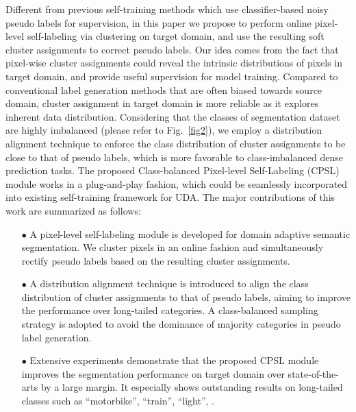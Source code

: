\documentclass[10pt,twocolumn,letterpaper]{article}
\begin{document}
	Different from previous self-training methods which use classifier-based noisy pseudo labels for supervision, in this paper we propose to perform online pixel-level self-labeling via clustering on target domain, and use the resulting soft cluster assignments to correct pseudo labels. Our idea comes from the fact that pixel-wise cluster assignments could reveal the intrinsic distributions of pixels in target domain, and provide useful supervision for model training. Compared to conventional label generation methods that are often biased towards source domain, cluster assignment in target domain is more reliable as it explores inherent data distribution. Considering that the classes of segmentation dataset are highly imbalanced (please refer to Fig.~\ref{fig2}), we employ a distribution alignment technique to enforce the class distribution of cluster assignments to be close to that of pseudo labels, which is more favorable to class-imbalanced dense prediction tasks. The proposed Class-balanced Pixel-level Self-Labeling (CPSL) module works in a plug-and-play fashion, which could be seamlessly incorporated into existing self-training framework for UDA. The major contributions of this work are summarized as follows:\\
\vspace{-0.5em}
	\vspace{-1.0em}\begin{itemize}[leftmargin=*]
		\item[$\bullet$] A pixel-level self-labeling module is developed for domain adaptive semantic segmentation. We cluster pixels in an online fashion and simultaneously rectify pseudo labels based on the resulting cluster assignments.\vspace{-0.5em}
		\item[$\bullet$] A distribution alignment technique is introduced to align the class distribution of cluster assignments to that of pseudo labels, aiming to improve the performance over long-tailed categories. A class-balanced sampling strategy is adopted to avoid the dominance of majority categories in pseudo label generation. \vspace{-0.5em}
		\item[$\bullet$] Extensive experiments demonstrate that the proposed CPSL module improves the segmentation performance on target domain over state-of-the-arts by a large margin. It especially shows outstanding results on long-tailed classes such as ``motorbike'', ``train'', ``light'', \etc.
	\end{itemize}\vspace{-1.0em}
	
\end{document}
